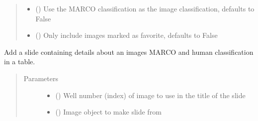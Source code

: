 \documentclass[letterpaper,10pt,english]{sphinxmanual}
\begin{document}
\begin{fulllineitems}
\begin{quote}
\begin{description}
\begin{itemize}
\item {} 
 (\sphinxstyleliteralemphasis{\sphinxupquote{, }}) \textendash{} Use the MARCO classification as the image classification, defaults to False

\item {} 
 (\sphinxstyleliteralemphasis{\sphinxupquote{, }}) \textendash{} Only include images marked as favorite, defaults to False

\end{itemize}

\end{description}\end{quote}

\begin{fulllineitems}
\label{\detokenize{polo.utils:polo.utils.io_utils.PptxWriter.add_classification_slide}}
Add a slide containing details about an images MARCO
and human classification in a table.
\begin{quote}\begin{description}
\item[{Parameters}] \leavevmode\begin{itemize}
\item {} 
 () \textendash{} Well number (index) of image to use in
the title of the slide

\item {} 
 ({\hyperref[\detokenize{polo.crystallography:polo.crystallography.image.Image}]{}}) \textendash{} Image object to make slide from

\end{itemize}

\end{description}\end{quote}


\end{fulllineitems}
\end{fulllineitems}
\end{document}
